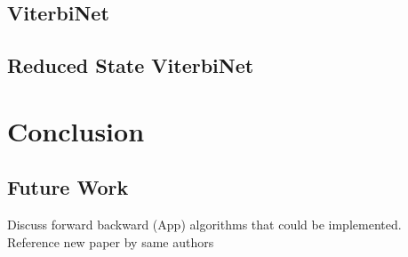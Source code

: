 \documentclass[12pt,a4paper]{article}
\begin{document}
\subsection*{ViterbiNet}
\subsection*{Reduced State ViterbiNet}
\section{Conclusion}
\subsection{Future Work}
Discuss forward backward (App) algorithms that could be implemented. Reference new paper by same authors

\newpage

\end{document}
